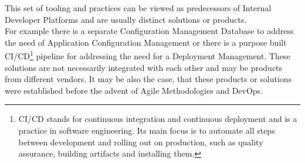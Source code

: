 \documentclass[a4paper,12pt]{article}
\begin{document}
    This set of tooling and practices can be viewed as predecessors of Internal Developer Platforms and are usually
    distinct solutions or products.\\
    For example there is a separate Configuration Management Database to address the need of Application Configuration
    Management or there is a purpose built CI/CD\footnote{CI/CD stands for continuous
    integration and continuous deployment and is a practice in software engineering. Its main focus is to automate all steps
    between development and rolling out on production, such as quality assurance, building artifacts and installing them.}
    pipeline for addressing the need for a Deployment Management.
    These solutions are not necessarily integrated with each other and may be products from different vendors.
    It may be also the case, that these products or solutions were established before the advent of Agile Methodologies and DevOps.
\end{document}
